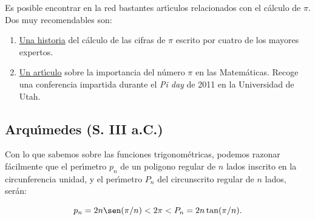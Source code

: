 Es posible encontrar en la red bastantes art\'{\i}culos relacionados con el
c\'alculo de $\pi$. Dos muy recomendables son:
\begin{enumerate}
 \item \href{http://150.244.21.37/PDFs/APROX/pi-quest.pdf}{Una historia} del c\'alculo de las
cifras de $\pi$ escrito por cuatro de los mayores expertos.
\item \href{http://150.244.21.37/PDFs/APROX/Pi2011.pdf}{Un art\'{\i}culo} sobre la importancia
del n\'umero $\pi$ en las Matem\'aticas. Recoge una conferencia impartida
durante el {\itshape Pi day} de 2011 en la Universidad de Utah.
\end{enumerate}







\subsection{Arqu\'{\i}medes (S. III a.C.)}

Con lo que sabemos sobre las funciones trigonom\'etricas, podemos razonar
f\'acilmente que el per\'{\i}metro
$p_n$ de un poligono regular de $n$ lados inscrito en la circunferencia unidad,
y el per\'{\i}metro
$P_n$ del circunscrito regular de $n$ lados, ser\'an: 

\[ p_n = 2n \sen(\pi/n)< 2\pi < P_n = 2n \tan(\pi/n). \]

